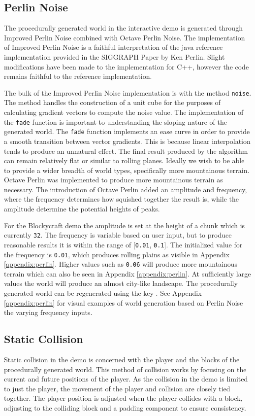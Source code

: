 \documentclass[a4paper,11pt,titlepage]{scrartcl}
\newcommand{\Blockycraft}{Blockycraft}
\begin{document}
\subsection{Perlin Noise}
The procedurally generated world in the interactive demo is generated through Improved Perlin Noise combined with Octave Perlin Noise.  The implementation of Improved Perlin Noise is a faithful interpretation of the java reference implementation provided in the SIGGRAPH Paper by Ken Perlin.  Slight modifications have been made to the implementation for C++, however the code remains faithful to the reference implementation.

The bulk of the Improved Perlin Noise implementation is with the method \texttt{noise}.  The method handles the construction of a unit cube for the purposes of calculating gradient vectors to compute the noise value.  The implementation of the \texttt{fade} function is important to understanding the sloping nature of the generated world.  The \texttt{fade} function implements an ease curve in order to provide a smooth transition between vector gradients.  This is because linear interpolation tends to produce an unnatural effect. The final result produced by the algorithm can remain relatively flat or similar to rolling planes.  Ideally we wish to be able to provide a wider breadth of world types, specifically more mountainous terrain.  Octave Perlin was implemented to produce more mountainous terrain as necessary.  The introduction of Octave Perlin added an amplitude and frequency, where the frequency determines how squished together the result is, while the amplitude determine the potential heights of peaks.
    
For the \Blockycraft{} demo the amplitude is set at the height of a chunk which is currently \texttt{32}.  The frequency is variable based on user input, but to produce reasonable results it is within the range of [\texttt{0.01}, \texttt{0.1}].  The initialized value for the frequency is \texttt{0.01}, which produces rolling plains as visible in Appendix \ref{appendix:perlin}.  Higher values such as \texttt{0.06} will produce more mountainous terrain which can also be seen in Appendix \ref{appendix:perlin}.  At sufficiently large values the world will produce an almost city-like landscape.
\vskip 2.5mm\noindent
The procedurally generated world can be regenerated using the key .  See Appendix \ref{appendix:perlin} for visual examples of world generation based on Perlin Noise the varying frequency inputs.
    
\subsection{Static Collision}
Static collision in the demo is concerned with the player and the blocks of the procedurally generated world.  This method of collision works by focusing on the current and future positions of the player.  As the collision in the demo is limited to just the player, the movement of the player and collision are closely tied together.  The player position is adjusted when the player collides with a block, adjusting to the colliding block and a padding component to ensure consistency.
\end{document}
